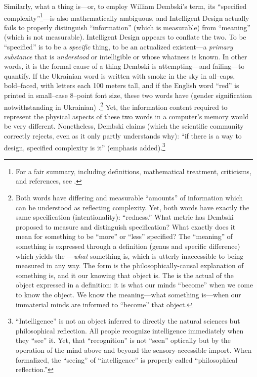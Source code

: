 Similarly, what a thing is---or, to employ William Dembski's term, its ``specified complexity''\footnote{For a fair summary, including definitions, mathematical treatment, criticisms, and references, see \citet{scwp}.}---is also mathematically ambiguous, and Intelligent Design actually fails to properly distinguish ``information'' (which is measurable) from ``meaning'' (which is not measurable).  Intelligent Design appears to conflate the two. To be ``specified'' is to be a \textit{specific} thing, to be an actualized existent---a \textit{primary substance} that is \textit{understood} or intelligible or whose whatness is known. In other words, it is the formal cause of a thing Dembski is attempting---and failing---to quantify.  If the Ukrainian word  is written with smoke in the sky in all--caps, bold--faced, with letters each 100 meters tall, and if the English word ``red'' is printed in small--case 8--point font size, these two words have (gender signification notwithstanding in Ukrainian) .\footnote{Both words have differing and measurable ``amounts'' of information which can be understood as reflecting complexity. Yet, both words have exactly the same specification (intentionality): ``redness.'' What metric has Dembski proposed to measure and distinguish  specification? What exactly does it mean for something to be  ``more'' or ``less'' specified? The ``meaning'' of something is expressed through a definition (genus and specific difference) which yields the ---\textit{what} something is, which is utterly inaccessible to being measured in any way. The form is the philosophically-causal explanation of  something is, and it  our knowing  that object is. The  is the actual  of the object expressed in a definition: it is what our minds ``become'' when we come to know the object. We know the meaning---what something is---when our immaterial minds are informed  to ``become'' that object.} Yet, the information content required to represent the physical aspects of these two words in a computer's memory would be very different.  Nonetheless, Dembski claims (which the scientific community correctly rejects, even as it only partly understands why): ``if there is a way to  design, specified complexity is it'' \citep[][p.~19]{dembskinfl} (emphasis added).\footnote{``Intelligence'' is not an object inferred to directly  the natural sciences but  philosophical reflection. All people recognize intelligence immediately when they ``see'' it. Yet, that ``recognition'' is not ``seen'' optically but by the operation of the mind above and beyond the sensory-accessible import. When formalized, the ``seeing'' of ``intelligence'' is properly called ``philosophical reflection.''}

